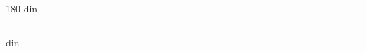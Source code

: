 
\begin{frame}
\begin{center}
\begin{turn}{180}
{\fontsize{2.5cm}{1em}\selectfont din}
\end{turn}
\vspace{1em}\par  
\hrule
\vspace{1em}\par  
{\fontsize{2.5cm}{1em}\selectfont din}
\end{center}
\end{frame}
